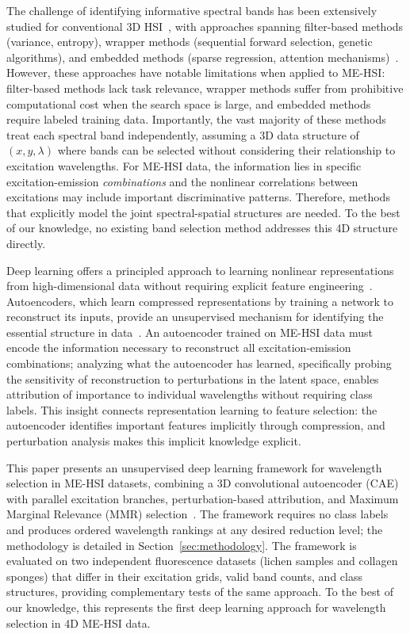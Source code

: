 The challenge of identifying informative spectral bands has been extensively studied for conventional 3D HSI~\cite{sun2019hyperspectral,jia2020survey,asfour2018,guan2018}, with approaches spanning filter-based methods (variance, entropy), wrapper methods (sequential forward selection, genetic algorithms), and embedded methods (sparse regression, attention mechanisms)~\cite{martinez2006comparison,chang2000constrained,pudil1994floating,pal2010feature,tibshirani1996regression,mou2017deep}.
However, these approaches have notable limitations when applied to ME-HSI: filter-based methods lack task relevance, wrapper methods suffer from prohibitive computational cost when the search space is large, and embedded methods require labeled training data.
Importantly, the vast majority of these methods treat each spectral band independently, assuming a 3D data structure of $(x, y, \lambda)$ where bands can be selected without considering their relationship to excitation wavelengths.
For ME-HSI data, the information lies in specific excitation-emission \emph{combinations} and the nonlinear correlations between excitations may include important discriminative patterns.
Therefore, methods that explicitly model the joint spectral-spatial structures are needed.
To the best of our knowledge, no existing band selection method addresses this 4D structure directly.

Deep learning offers a principled approach to learning nonlinear representations from high-dimensional data without requiring explicit feature engineering~\cite{lecun2015deep}.
Autoencoders, which learn compressed representations by training a network to reconstruct its inputs, provide an unsupervised mechanism for identifying the essential structure in data~\cite{hinton2006reducing,bengio2013representation}.
An autoencoder trained on ME-HSI data must encode the information necessary to reconstruct all excitation-emission combinations; analyzing what the autoencoder has learned, specifically probing the sensitivity of reconstruction to perturbations in the latent space, enables attribution of importance to individual wavelengths without requiring class labels.
This insight connects representation learning to feature selection: the autoencoder identifies important features implicitly through compression, and perturbation analysis makes this implicit knowledge explicit.

This paper presents an unsupervised deep learning framework for wavelength selection in ME-HSI datasets, combining a 3D convolutional autoencoder (CAE) with parallel excitation branches, perturbation-based attribution, and Maximum Marginal Relevance (MMR) selection~\cite{carbonell1998use}.
The framework requires no class labels and produces ordered wavelength rankings at any desired reduction level; the methodology is detailed in Section~\ref{sec:methodology}.
The framework is evaluated on two independent fluorescence datasets (lichen samples and collagen sponges) that differ in their excitation grids, valid band counts, and class structures, providing complementary tests of the same approach.
To the best of our knowledge, this represents the first deep learning approach for wavelength selection in 4D ME-HSI data.
